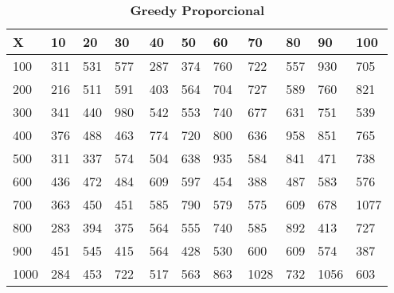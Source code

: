 \documentclass[10pt,letterpaper]{article}
\begin{document}
\begin{center}
\begin{table}\renewcommand{\arraystretch}{2.5}
\caption{\large \textbf{Greedy Proporcional}}
\centering
\begin{tabular} { |m{0.5cm}|m{1.3cm}|m{1.3cm}|m{1.3cm}|m{1.3cm}|m{1.3cm}|m{1.3cm}|m{1.3cm}|m{1.3cm}|m{1.3cm}|m{1.3cm}|} 
\hline
\rowcolor{Gray}
\centering \textbf{X} & \centering \textbf{10} & \centering \textbf{20} & \centering \textbf{30}\ & \centering \textbf{40} & \centering \textbf{50} & \centering \textbf{60}\ & \centering \textbf{70} & \centering \textbf{80} & \centering \textbf{90}\ & \textbf{100} \\\hline
\cellcolor{Gray}100 & \Large 311 & \Large 531 & \Large 577 & \Large 287 & \Large 374 & \Large 760 & \Large 722 & \Large 557 & \Large 930 & \Large 705 \\
\hline
\cellcolor{Gray}200 & \Large 216 & \Large 511 & \Large 591 & \Large 403 & \Large 564 & \Large 704 & \Large 727 & \Large 589 & \Large 760 & \Large 821 \\
\hline
\cellcolor{Gray}300 & \Large 341 & \Large 440 & \Large 980 & \Large 542 & \Large 553 & \Large 740 & \Large 677 & \Large 631 & \Large 751 & \Large 539 \\
\hline
\cellcolor{Gray}400 & \Large 376 & \Large 488 & \Large 463 & \Large 774 & \Large 720 & \Large 800 & \Large 636 & \Large 958 & \Large 851 & \Large 765 \\
\hline
\cellcolor{Gray}500 & \Large 311 & \Large 337 & \Large 574 & \Large 504 & \Large 638 & \Large 935 & \Large 584 & \Large 841 & \Large 471 & \Large 738 \\
\hline
\cellcolor{Gray}600 & \Large 436 & \Large 472 & \Large 484 & \Large 609 & \Large 597 & \Large 454 & \Large 388 & \Large 487 & \Large 583 & \Large 576 \\
\hline
\cellcolor{Gray}700 & \Large 363 & \Large 450 & \Large 451 & \Large 585 & \Large 790 & \Large 579 & \Large 575 & \Large 609 & \Large 678 & \Large 1077 \\
\hline
\cellcolor{Gray}800 & \Large 283 & \Large 394 & \Large 375 & \Large 564 & \Large 555 & \Large 740 & \Large 585 & \Large 892 & \Large 413 & \Large 727 \\
\hline
\cellcolor{Gray}900 & \Large 451 & \Large 545 & \Large 415 & \Large 564 & \Large 428 & \Large 530 & \Large 600 & \Large 609 & \Large 574 & \Large 387 \\
\hline
\cellcolor{Gray}1000 & \Large 284 & \Large 453 & \Large 722 & \Large 517 & \Large 563 & \Large 863 & \Large 1028 & \Large 732 & \Large 1056 & \Large 603 \\
\hline
\end{tabular} \\
\end{table}
\end{center}
\end{document}
